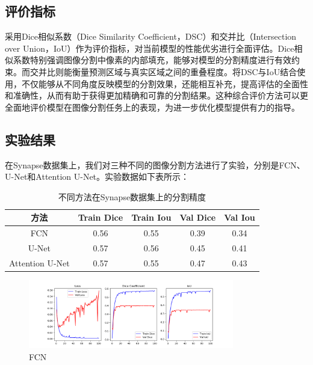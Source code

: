 \documentclass[a4paper,12pt]{report}
\begin{document}
\subsection{评价指标}
采用Dice相似系数（Dice Similarity Coefficient，DSC）和交并比（Intersection over Union，IoU）作为评价指标，对当前模型的性能优劣进行全面评估。Dice相似系数特别强调图像分割中像素的内部填充，能够对模型的分割精度进行有效约束。而交并比则能衡量预测区域与真实区域之间的重叠程度。将DSC与IoU结合使用，不仅能够从不同角度反映模型的分割效果，还能相互补充，提高评估的全面性和准确性，从而有助于获得更加精确和可靠的分割结果。这种综合评价方法可以更全面地评价模型在图像分割任务上的表现，为进一步优化模型提供有力的指导。

\subsection{实验结果}

在Synapse数据集上，我们对三种不同的图像分割方法进行了实验，分别是FCN、U-Net和Attention U-Net。实验数据如下表所示：

\begin{table}[H]
    \centering
    \begin{tabular}{ccccc}
         \toprule %
         方法 & Train Dice & Train Iou & Val Dice & Val Iou\\
         \midrule %
         FCN & 0.56 & 0.55 & 0.39 & 0.34\\
         U-Net & 0.57 & 0.56 & 0.45 & 0.41\\
         Attention U-Net & 0.57 & 0.55 & 0.47 & 0.43\\
         \bottomrule %
    \end{tabular}
    \caption{不同方法在Synapse数据集上的分割精度}
\end{table}



\begin{figure}[H]
    \centering
    \includegraphics[width=0.8\textwidth]{figure/FCNtraining_metrics_epochs_100.png}
    \caption{FCN}
    \label{fig:login}
\end{figure}
\end{document}
